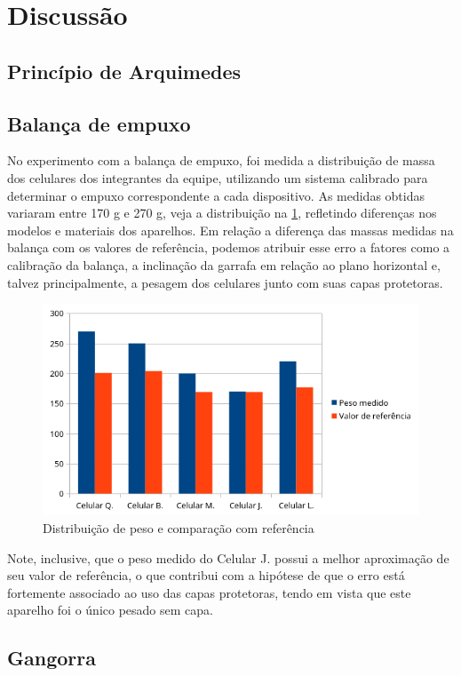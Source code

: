 \section{Discussão}
\subsection{Princípio de Arquimedes}

\subsection{Balança de empuxo}
No experimento com a balança de empuxo, foi medida a distribuição de massa dos
celulares dos integrantes da equipe, utilizando um sistema calibrado para
determinar o empuxo correspondente a cada dispositivo. As medidas obtidas
variaram entre 170 g e 270 g, veja a distribuição na \cref{pesos}, refletindo
diferenças nos modelos e materiais dos
aparelhos. Em relação a diferença das massas medidas na balança com os valores
de referência, podemos atribuir esse erro a fatores como a calibração da
balança, a inclinação da garrafa em relação ao plano horizontal e, talvez
principalmente, a pesagem dos celulares junto com suas capas protetoras.
\begin{figure}[H]
    \centering
    \includegraphics[width=.5\linewidth]{fig/pesos.png}
    \caption{Distribuição de peso e comparação com referência}
    \label{pesos}
\end{figure}
Note, inclusive, que o peso medido do Celular J. possui a melhor aproximação de
seu valor de referência, o que contribui com a hipótese de que o erro está
fortemente associado ao uso das capas protetoras, tendo em vista que este
aparelho foi o único pesado sem capa.
\subsection{Gangorra}


